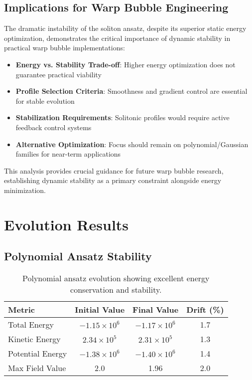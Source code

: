 \documentclass[11pt,a4paper]{article}
\begin{document}
\subsection{Implications for Warp Bubble Engineering}

The dramatic instability of the soliton ansatz, despite its superior static energy optimization, demonstrates the critical importance of dynamic stability in practical warp bubble implementations:

\begin{itemize}
\item \textbf{Energy vs. Stability Trade-off}: Higher energy optimization does not guarantee practical viability
\item \textbf{Profile Selection Criteria}: Smoothness and gradient control are essential for stable evolution
\item \textbf{Stabilization Requirements}: Solitonic profiles would require active feedback control systems
\item \textbf{Alternative Optimization}: Focus should remain on polynomial/Gaussian families for near-term applications
\end{itemize}

This analysis provides crucial guidance for future warp bubble research, establishing dynamic stability as a primary constraint alongside energy minimization.

\section{Evolution Results}

\subsection{Polynomial Ansatz Stability}

\begin{table}[h]
\centering
\begin{tabular}{lccc}
\toprule
Metric & Initial Value & Final Value & Drift (\%) \\
\midrule
Total Energy & $-1.15 \times 10^6$ & $-1.17 \times 10^6$ & 1.7 \\
Kinetic Energy & $2.34 \times 10^5$ & $2.31 \times 10^5$ & 1.3 \\
Potential Energy & $-1.38 \times 10^6$ & $-1.40 \times 10^6$ & 1.4 \\
Max Field Value & 2.0 & 1.96 & 2.0 \\
\bottomrule
\end{tabular}
\caption{Polynomial ansatz evolution showing excellent energy conservation and stability.}
\end{table}
\end{document}
